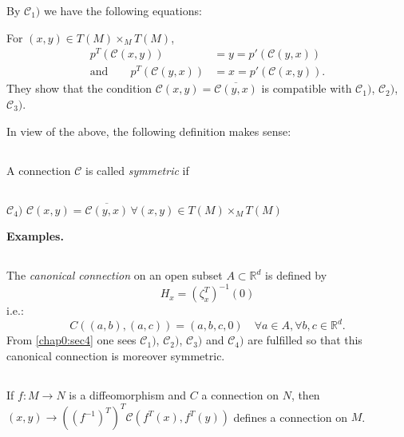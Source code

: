 \begin{remark*}
By $\mathcal{C}_{1})$ we have the following equations:

For $(x,y)\in T(M){\displaystyle{\mathop{\times}_{M}}}T(M)$,
\begin{align*}
p^{T}(\mathcal{C}(x,y)) &= y=p'(\mathcal{C}(y,x))\\
\text{and}\qquad p^{T}(\mathcal{C}(y,x)) &= x=p'(\mathcal{C}(x,y)).
\end{align*}
They show that the condition
$\mathcal{C}(x,y)=\overline{\mathcal{C}(y,x)}$ is compatible with
$\mathcal{C}_{1})$, $\mathcal{C}_{2})$, $\mathcal{C}_{3})$.
\end{remark*}

In view of the above, the following definition makes sense:

\subsection{}\label{chap2:2.1.14}

\begin{defi*}
A connection $\mathcal{C}$ is called {\em symmetric} if 
\end{defi*}

\setcounter{subsection}{14}
\subsection{}\label{chap2:2.1.15}
$\mathcal{C}_{4})$
$\mathcal{C}(x,y)=\overline{\mathcal{C}(y,x)} \, \forall (x,y)\in
T(M){\displaystyle{\mathop{\times}_{M}}}T(M)$ 

\medskip
\noindent
{\bf Examples.}

\setcounter{subsection}{15}
\subsection{}\label{chap2:2.1.16}
The {\em canonical connection} on an open subset $A\subset
\mathbb{R}^{d}$ is defined by
\begin{equation*}
H_{x}=(\zeta^{T}_{x})^{-1}(0)\tag{2.1.17}\label{chap2:2.1.17}
\end{equation*}
i.e.:
$$
C((a,b),(a,c))=(a,b,c,0)\quad \forall a\in A,\forall b, c\in \mathbb{R}^{d}.
$$
From \pageoriginale \ref{chap0:sec4} one sees $\mathcal{C}_{1})$,
$\mathcal{C}_{2})$, $\mathcal{C}_{3})$ and $\mathcal{C}_{4})$ are
fulfilled so that this canonical connection is moreover symmetric.

\setcounter{subsection}{17}
\subsection{}\label{chap2:2.1.18}
If $f:M\to N$ is a diffeomorphism and $C$ a connection on $N$, then
$(x,y)\to ((f^{-1})^{T})^{T}\mathcal{C}(f^{T}(x),f^{T}(y))$ defines a
connection on $M$.

